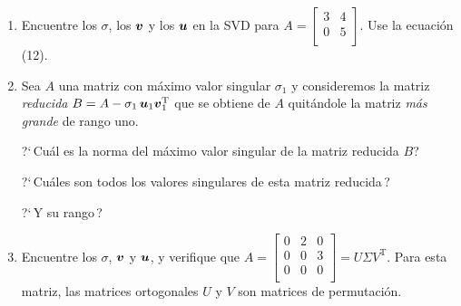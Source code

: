 \documentclass[12pt,a4paper]{article}
\newcommand{\bi}[1]{\hbox{\boldmath$#1$}}
\newcommand\1{\mbox{\,\vrule height-0.8pt depth1.0pt width2pc\,}}
\newcommand\2{\mbox{\,\vrule height-0.8pt depth1.0pt width1pc\,}}
\DeclareRobustCommand\transp{^{\mathrm{T}}}
\newcommand{\bu}{\hbox{\boldmath$u$}}
\newcommand{\bv}{\hbox{\boldmath$v$}}
\begin{document}
\begin{enumerate}
\item Encuentre los $\sigma$, los $\bv$ y los $\bu$ en la  SVD para  $A=\left[\begin{array}{ll}3&4\\0&5\\\end{array}\right]$. Use la ecuaci\'on (12).




\item Sea $A$ una matriz con máximo valor singular $\sigma_1$ y consideremos la matriz \emph{reducida} $B=A-\sigma_1\,\bu_1\bv_1\transp$ que se obtiene de $A$ quitándole la matriz \emph{más grande} de rango uno. 

?`\,Cu\'al es la norma del máximo valor singular de la matriz reducida $B$? 


?`\,Cu\'ales son todos los valores singulares de esta matriz reducida\,?

?`\,Y su rango\,? 




\item  Encuentre los $\sigma$, $\bv$ y $\bu$, y verifique que $A=\left[\begin{array}{lll}0&2&0\\0&0&3\\0&0&0\\\end{array}\right]=U\Sigma V\transp$. Para esta matriz, las matrices ortogonales  $U$ y $V$ son matrices de permutaci\'on.



\end{enumerate}
\end{document}
